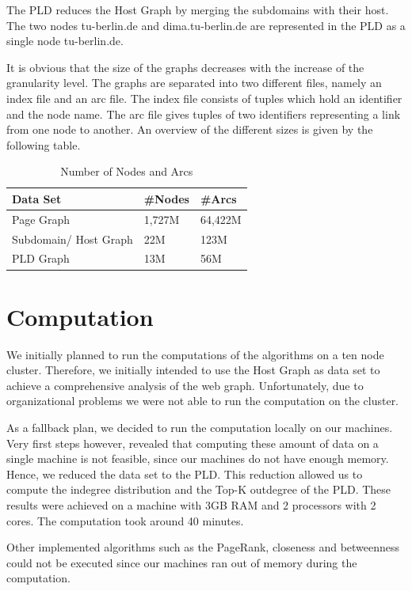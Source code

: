 The PLD reduces the Host Graph by merging the subdomains with their host. The two nodes tu-berlin.de and dima.tu-berlin.de are represented in the PLD as a single node tu-berlin.de.

It is obvious that the size of the graphs decreases with the increase of the granularity level. The graphs are separated into two different files, namely an index file and an arc file. The index file consists of tuples which hold an identifier and the node name. The arc file gives tuples of two identifiers representing a link from one node to another. An overview of the different sizes is given by the following table.

\begin{table}[t]
	\caption{Number of Nodes and Arcs}
	\label{t2}
	\begin{center}
		\begin{tabular}{|l|l|l|}
			\hline
			Data Set	&\#Nodes	&\#Arcs \\ \hline
			Page Graph	&1,727M	&64,422M	\\	\hline
			Subdomain/ Host Graph	&22M	&123M	\\	\hline		
			PLD Graph	&13M	&56M	\\	\hline				
		\end{tabular}
	\end{center}
\end{table}

\section{Computation}
We initially planned to run the computations of the algorithms on a ten node cluster. Therefore, we initially intended to use the Host Graph as data set to achieve a comprehensive  analysis of the web graph. Unfortunately, due to organizational problems we were not able to run the computation on the cluster.

As a fallback plan, we decided to run the computation locally on our machines. Very first steps however, revealed that computing these amount of data on a single machine is not feasible, since our machines do not have enough memory. Hence, we reduced the data set to the PLD. This reduction allowed us to compute the indegree distribution and the Top-K outdegree of the PLD. These results were achieved on a machine with 3GB RAM and 2 processors with 2 cores. The computation took around 40 minutes. 

Other implemented algorithms such as the PageRank, closeness and betweenness could not be executed since our machines ran out of memory during the computation.

